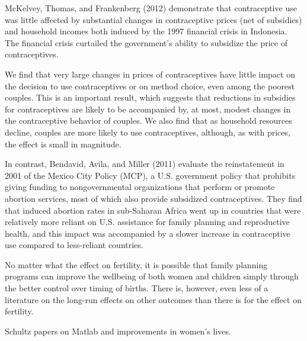 \documentclass[letterpaper,12pt]{article}
\begin{document}
\citep{McKelvey2012}

McKelvey, Thomas, and Frankenberg (2012) demonstrate that contraceptive
use was little affected by substantial changes in contraceptive prices
(net of subsidies) and household incomes both induced by the 1997
ﬁnancial crisis in Indonesia.
The financial crisis curtailed the government's ability to 
subsidize the price of contraceptives.

We ﬁnd that very large changes in prices of contraceptives have little
impact on the decision to use contraceptives or on method choice, even
among the poorest couples. This is an important result, which suggests
that reductions in subsidies for contraceptives are likely to be
accompanied by, at most, modest changes in the contraceptive behavior of
couples. We also ﬁnd that as household resources decline, couples are
more likely to use contraceptives, although, as with prices, the effect
is small in magnitude.

\citep{Bendavid2011}

In contrast, Bendavid, Avila, and Miller (2011) evaluate the
reinstatement in 2001 of the Mexico City Policy (MCP), a U.S. government
policy that prohibits giving funding to nongovernmental organizations
that perform or promote abortion services, most of which also provide
subsidized contraceptives. They ﬁnd that induced abortion rates in
sub-Saharan Africa went up in countries that were relatively more
reliant on U.S. assistance for family planning and reproductive health,
and this impact was accompanied by a slower increase in contraceptive
use compared to less-reliant countries.


No matter what the effect on fertility, it is possible that 
family planning programs can improve the wellbeing of both women and 
children simply through the better control over timing of births.
There is, however, even less of a literature on the long-run effects on
other outcomes than there is for the effect on fertility.

Schultz papers on Matlab and improvements in women's lives.

\citep{DasGupta2011}

\citet{Sinha2005}

\citep{Joshi2007}


\citep{Li2005}

\end{document}

